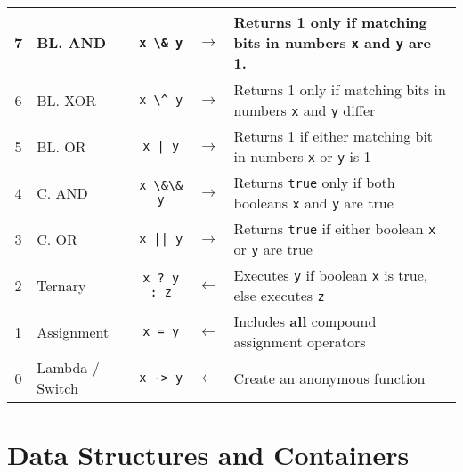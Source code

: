 \documentclass{article}
\begin{document}
\begin{center}
\begin{tabularx}{\textwidth}{clccX}
7 & BL. AND           & \lstinline|x \& y|    & \(\to\) & Returns 1 only if matching bits in numbers \lstinline|x| and \lstinline|y| are 1. \\\midrule
6 & BL. XOR           & \lstinline|x \^ y|    & \(\to\) & Returns 1 only if matching bits in numbers \lstinline|x| and \lstinline|y| differ\\\midrule
5 & BL. OR            & \lstinline+x | y+     & \(\to\) & Returns 1 if either matching bit in numbers \lstinline|x| or \lstinline|y| is 1\\\midrule
4 & C. AND            & \lstinline|x \&\& y|  & \(\to\) & Returns \lstinline|true| only if both booleans \lstinline|x| and \lstinline|y| are true\\\midrule
3 & C. OR             & \lstinline+x || y+    & \(\to\) & Returns \lstinline|true| if either boolean \lstinline|x| or \lstinline|y| are true\\\midrule
2 & Ternary           & \lstinline|x ? y : z| & \(\gets\) & Executes \lstinline|y| if boolean \lstinline|x| is true, else executes \lstinline|z|\\\midrule

1 & Assignment        & \lstinline!x = y!     & \(\gets\) & Includes \textbf{all} compound assignment operators \\\midrule
0 & Lambda / Switch   & \lstinline|x -> y|    & \(\gets\) & Create an anonymous function\\\bottomrule
\end{tabularx}\end{center}

\section{Data Structures and Containers}
\end{document}
